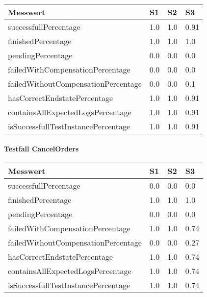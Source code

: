 \begin{center}
	\fontsize{9}{12}\selectfont
	\begin{longtable}[h]{|p{5cm}|p{1cm}|p{1cm}|p{1cm}|}
		\hline
		Messwert & S1 & S2 & S3 \\ \hline
		\endhead
		\endfoot
		successfull\-Percentage & 1.0 & 1.0 & 0.91 \\ \hline
		finished\-Percentage & 1.0 & 1.0 & 1.0 \\ \hline
		pending\-Percentage & 0.0 & 0.0 & 0.0 \\ \hline
		failedWithCompensation\-Percentage & 0.0 & 0.0 & 0.0 \\ \hline
		failedWithoutCompensation\-Percentage & 0.0 & 0.0 & 0.1 \\ \hline
		hasCorrectEndstate\-Percentage & 1.0 & 1.0 & 0.91 \\ \hline
		containsAllExpectedLogs\-Percentage & 1.0 & 1.0 & 0.91 \\ \hline
		isSuccessfullTestInstance\-Percentage & 1.0 & 1.0 & 0.91 \\ \hline
	\end{longtable}
\end{center}
\FloatBarrier

\paragraph*{Testfall CancelOrders}

\begin{center}
	\fontsize{9}{12}\selectfont
	\begin{longtable}[h]{|p{5cm}|p{1cm}|p{1cm}|p{1cm}|}
		\hline
		Messwert & S1 & S2 & S3 \\ \hline
		\endhead
		\endfoot
		successfull\-Percentage & 0.0 & 0.0 & 0.0 \\ \hline
		finished\-Percentage & 1.0 & 1.0 & 1.0 \\ \hline
		pending\-Percentage & 0.0 & 0.0 & 0.0 \\ \hline
		failedWithCompensation\-Percentage & 1.0 & 1.0 & 0.74 \\ \hline
		failedWithoutCompensation\-Percentage & 0.0 & 0.0 & 0.27 \\ \hline
		hasCorrectEndstate\-Percentage & 1.0 & 1.0 & 0.74 \\ \hline
		containsAllExpectedLogs\-Percentage & 1.0 & 1.0 & 0.74 \\ \hline
		isSuccessfullTestInstance\-Percentage & 1.0 & 1.0 & 0.74 \\ \hline
	\end{longtable}
\end{center}
\FloatBarrier

